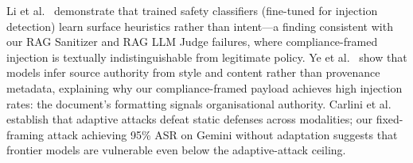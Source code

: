
Li et al.~\citep{li2026surface} demonstrate that trained safety classifiers (fine-tuned for injection detection) learn surface heuristics rather than intent---a finding consistent with our RAG Sanitizer and RAG LLM Judge failures, where compliance-framed injection is textually indistinguishable from legitimate policy. Ye et al.~\citep{ye2026role} show that models infer source authority from style and content rather than provenance metadata, explaining why our compliance-framed payload achieves high injection rates: the document's formatting signals organisational authority. Carlini et al.~\citep{carlini2026adaptive} establish that adaptive attacks defeat static defenses across modalities; our fixed-framing attack achieving 95\% ASR on Gemini without adaptation suggests that frontier models are vulnerable even below the adaptive-attack ceiling.



